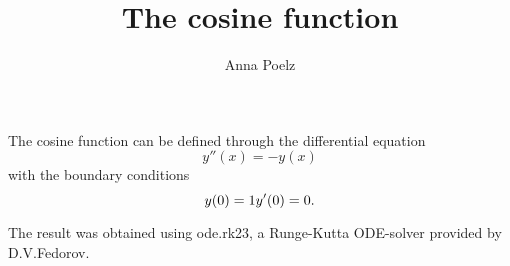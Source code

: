 \documentclass{article}
\title{The cosine function}
\author{Anna Poelz}
\begin{document}
\maketitle
The cosine function can be defined through the differential equation
\begin{equation}
	y''(x)=-y(x)
\end{equation}
with the boundary conditions
\begin{equation}
	y(0)=1\\
	y'(0)=0.
\end{equation}

The result was obtained using ode.rk23, a Runge-Kutta ODE-solver provided by D.V.Fedorov. 

%	
\end{document}
